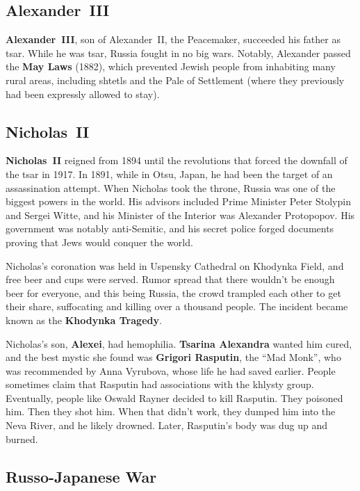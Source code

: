 \subsection*{Alexander~III}

\textbf{Alexander~III}, son of Alexander~II, the Peacemaker, succeeded his father as tsar.
While he was tsar, Russia fought in no big wars.
Notably, Alexander passed the \textbf{May Laws} (1882),
which prevented Jewish people from inhabiting many rural areas,
including shtetls and the Pale of Settlement
(where they previously had been expressly allowed to stay).

\subsection*{Nicholas~II}

\textbf{Nicholas~II} reigned from 1894 until the revolutions
that forced the downfall of the tsar in 1917.
In 1891, while in Otsu, Japan, he had been the target of an assassination attempt.
When Nicholas took the throne, Russia was one of the biggest powers in the world.
His advisors included Prime Minister Peter Stolypin and Sergei Witte,
and his Minister of the Interior was Alexander Protopopov.
His government was notably anti-Semitic,
and his secret police forged documents proving that Jews would conquer the world.

Nicholas's coronation was held in Uspensky Cathedral on Khodynka Field,
and free beer and cups were served.
Rumor spread that there wouldn't be enough beer for everyone, and this being Russia,
the crowd trampled each other to get their share, suffocating and killing over a thousand people.
The incident became known as the \textbf{Khodynka Tragedy}.

Nicholas's son, \textbf{Alexei}, had hemophilia.
\textbf{Tsarina Alexandra} wanted him cured,
and the best mystic she found was \textbf{Grigori Rasputin}, the ``Mad Monk'',
who was recommended by Anna Vyrubova, whose life he had saved earlier.
People sometimes claim that Rasputin had associations with the khlysty group.
Eventually, people like Oswald Rayner decided to kill Rasputin.
They poisoned him.
Then they shot him.
When that didn't work, they dumped him into the Neva River, and he likely drowned.
Later, Rasputin's body was dug up and burned.

\subsection*{Russo-Japanese War}

